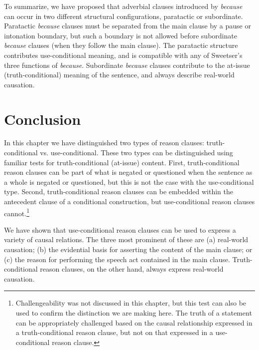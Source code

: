 To summarize, we have proposed that adverbial clauses introduced by \textit{because} can occur in two different structural configurations, paratactic or subordinate. Paratactic \textit{because} clauses must be separated from the main clause by a pause or intonation boundary, but such a boundary is not allowed before subordinate \textit{because} clauses (when they follow the main clause). The paratactic structure contributes use-conditional meaning, and is compatible with any of Sweetser’s three functions of \textit{because}. Subordinate \textit{because} clauses contribute to the at-issue (truth-conditional) meaning of the sentence, and always describe real-world causation.





\section{Conclusion}\label{sec:18.6}

In this chapter we have distinguished two types of reason clauses: truth-conditional vs. use-conditional. These two types can be distinguished using familiar tests for truth-conditional (at-issue) content. First, truth-conditional reason clauses can be part of what is negated or questioned when the sentence as a whole is negated or questioned, but this is not the case with the use-conditional type. Second, truth-conditional reason clauses can be embedded within the antecedent clause of a conditional construction, but use-conditional reason clauses cannot.\footnote{Challengeability  was not discussed in this chapter, but this test can also be used to confirm the distinction we are making here. The truth of a statement can be appropriately challenged based on the causal relationship expressed in a truth-conditional reason clause, but not on that expressed in a use-conditional reason clause.}


We have shown that use-conditional reason clauses can be used to express a variety of causal relations. The three most prominent of these are (a) real-world causation; (b) the evidential basis for asserting the content of the main clause; or (c) the reason for performing the speech act contained in the main clause. Truth-conditional reason clauses, on the other hand, always express real-world causation.  


